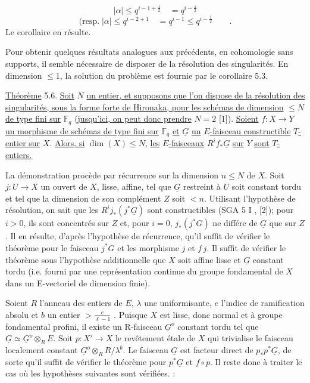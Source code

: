 \begin{equation*}
|\alpha| \leq q^{i-1+\frac{1}{2}} \quad = q^{i-\frac{1}{2}}
\end{equation*}
\begin{equation*}
(\mathrm{resp.} \; |\alpha| \leq q^{i-2+1} \quad = q^{i-1} \leq q^{i-\frac{1}{2}} \qquad .
\end{equation*}
Le corollaire en résulte.



Pour obtenir quelques résultats analogues aux précédents, en cohomologie sans supports, il semble nécessaire de disposer de la résolution des singularités. En dimension $\leq 1$, la solution du problème est fournie par le corollaire 5.3.

\underline{Théorème} 5.6. \underline{Soit} $N$ \underline{un entier, et supposons que l'on dispose de la résolution des singularités, sous la forme forte de Hironaka, pour les schémas de dimension} $\leq N$ \underline{de type fini sur} $\mathbb{F}_q$ (\underline{jusqu'ici, on peut donc prendre} $N = 2$ [1]). \underline{Soient} $f : X \longrightarrow Y$ \underline{un morphisme de schémas de type fini sur} $\mathbb{F}_q$ \underline{et} $\underline{G}$ \underline{un} $E$\underline{-faisceau constructible} $T$\underline{-entier sur} $X$. \underline{Alors, si} $\dim(X) \leq N$, \underline{les} $E$\underline{-faisceaux} $R^i f_*\underline{G}$ \underline{sur} $Y$ \underline{sont} $T$\underline{-entiers.}

La démonstration procède par récurrence sur la dimension $n \leq N$ de $X$. Soit $j : U \longrightarrow X$ un ouvert de $X$, lisse, affine, tel que $\underline{G}$ restreint à $U$ soit constant tordu et tel que la dimension de son complément $Z$ soit $< n$. Utilisant l'hypothèse de résolution, on sait que les $R^i j_*(j^*\underline{G})$ sont constructibles (SGA 5 I \quad , [2]); pour $i > 0$, ils sont concentrés sur $Z$ et, pour $i = 0$, $j_*(j^*G)$ ne différe de $\underline{G}$ que sur $Z$. Il en résulte, d'après l'hypothèse de récurrence, qu'il suffit de vérifier le théorème pour le faisceau $j^*G$ et les morphisme $j$ et $f\,j$. Il suffit de vérifier le théorème sous l'hypothèse additionnelle que $X$ soit affine lisse et $\underline{G}$ constant tordu (i.e. fourni par une représentation continue du groupe fondamental de $X$ dans un E-vectoriel de dimension finie).



Soient $R$ l'anneau des entiers de $E$, $\lambda$ une uniformisante, $e$ l'indice de ramification absolu et $b$ un entier $> \frac{e}{\ell-1}$ . Puisque $X$ est lisse, donc normal et à groupe fondamental profini, il existe un R-faisceau $\underline{G}^o$ constant tordu tel que $\underline{G} \simeq \underline{G}^o \otimes_R E$. Soit $p : X' \longrightarrow X$ le revêtement étale de $X$ qui trivialise le faisceau localement constant $\underline{G}^o \otimes_R R/\lambda^b$. Le faisceau $\underline{G}$ est facteur direct de $p_*p^*\underline{G}$, de sorte qu'il suffit de vérifier le théorème pour $p^*\underline{G}$ et $f \circ p$. Il reste donc à traiter le cas où les hypothèses suivantes sont vérifiées. :

